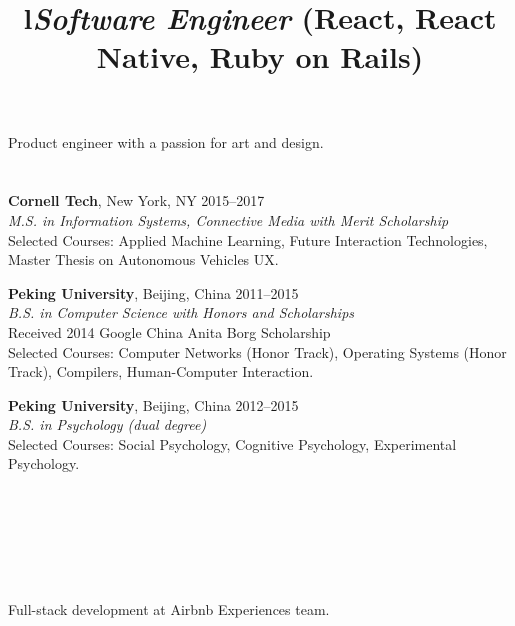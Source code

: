 \begin{resume}

\vspace{25pt}

\section{}

Product engineer with a passion for art and design.

\section{}

\textbf{Cornell Tech}, New York, NY \hfill 2015--2017 \\
\textsl{M.S. in Information Systems, Connective Media with Merit Scholarship} \\
Selected Courses: Applied Machine Learning, Future Interaction
Technologies, Master Thesis on Autonomous Vehicles UX.

\textbf{Peking University}, Beijing, China \hfill 2011--2015 \\ 
\textsl{B.S. in Computer Science with Honors and Scholarships}\\
Received 2014 Google China Anita Borg Scholarship \\
Selected Courses: Computer Networks (Honor Track), Operating Systems (Honor Track), Compilers, Human-Computer Interaction.

\textbf{Peking University}, Beijing, China \hfill 2012--2015 \\ 
\textsl{B.S. in Psychology (dual degree)}\\
Selected Courses: Social Psychology, Cognitive Psychology, Experimental Psychology.

\begin{formatb}
  \\
  \title{l}\\
  \body\\
\end{formatb}


\section{}

\title{\textsl{Software Engineer} (React, React Native, Ruby on Rails)}
\begin{position}
Full-stack development at Airbnb Experiences team. 
\end{position}


\end{resume}
